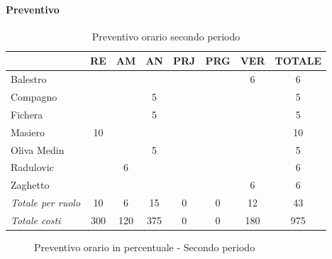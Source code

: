 \documentclass[a4paper,12pt]{article}
\begin{document}
            \paragraph{Preventivo}
                \begin{table}[H]
                \centering
                \begin{tabular}{|l|c|c|c|c|c|c|c|}
                \hline
                    \rowcolor{lightgray}{\textbf{Membro}} & {\textbf{RE}} & {\textbf{AM}} & {\textbf{AN}} & {\textbf{PRJ}} & {\textbf{PRG}} & {\textbf{VER}} & {\textbf{TOTALE}}\\
                \hline
                    Balestro & & & & & & 6 & 6\\
                \hline
                    Compagno & & & 5 & & & & 5\\
                \hline
                    Fichera & & & 5 & & & & 5\\
                \hline
                    Masiero & 10 & & & & & & 10\\
                \hline
                    Oliva Medin & & & 5 & & & & 5\\
                \hline
                    Radulovic & & 6 & & & & & 6\\
                \hline
                    Zaghetto & & & & & & 6 & 6\\
                \hline
                    \rowcolor{lightgray}\textit{Totale per ruolo} & 10 & 6 & 15 & 0 & 0 & 12 & 43\\
                \hline
                    \rowcolor{lightgray}\textit{Totale costi} & 300 & 120 & 375 & 0 & 0 & 180 & 975\\
                \hline
                \end{tabular}
                \caption{Preventivo orario secondo periodo}
                \end{table}

                \begin{figure}[H]
                \centering
                \caption{Preventivo orario in percentuale - Secondo periodo}
                \end{figure}
        
\end{document}
